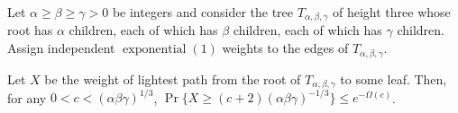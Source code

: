 \documentclass{patmorin}
\DeclareMathOperator{\exponential}{exponential}
\DeclareMathOperator{\binomial}{binomial}
\begin{document}
%
%

Let $\alpha \ge \beta \ge \gamma > 0$ be integers and consider the
tree $T_{\alpha,\beta,\gamma}$ of height three whose root has $\alpha$
children, each of which has $\beta$ children, each of which has $\gamma$
children.  Assign independent $\exponential(1)$ weights to the edges
of $T_{\alpha,\beta,\gamma}$.

\begin{lem}
   Let $X$ be the weight of lightest path from the root of
   $T_{\alpha,\beta,\gamma}$ to some leaf.  Then, for any $0<c<(\alpha\beta\gamma)^{1/3}$,  $\Pr\{X \ge (c+2)(\alpha\beta\gamma)^{-1/3} \} \le e^{-\Omega(c)}$.
\end{lem}
\end{document}
